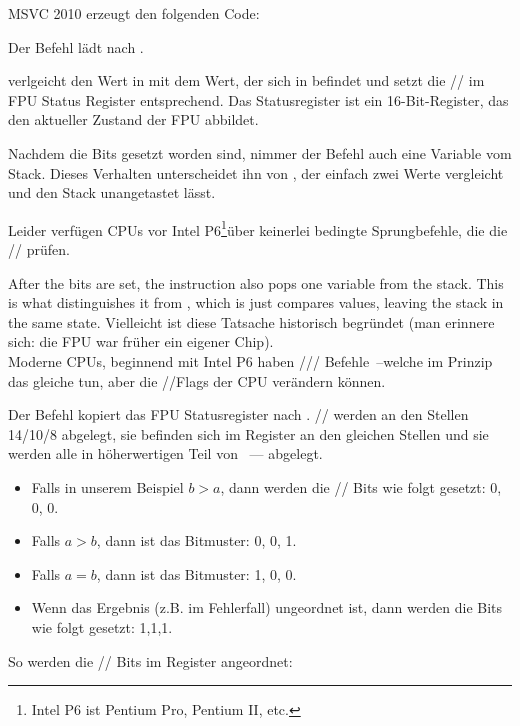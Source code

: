 
MSVC 2010 erzeugt den folgenden Code:




Der Befehl \FLD lädt  nach .

\label{Czero_etc}
\newcommand{\Czero}{\GTT{C0}\xspace}
\newcommand{\Ctwo}{\GTT{C2}\xspace}
\newcommand{\Cthree}{\GTT{C3}\xspace}
\newcommand{\CThreeBits}{\Cthree/\Ctwo/\Czero}

\FCOMP verlgeicht den Wert in  mit dem Wert, der sich in 
befindet und setzt die \CThreeBits im FPU Status Register entsprechend.
Das Statusregister ist ein 16-Bit-Register, das den aktueller Zustand der FPU
abbildet.

Nachdem die Bits gesetzt worden sind, nimmer der \FCOMP Befehl auch eine
Variable vom Stack. Dieses Verhalten unterscheidet ihn von \FCOM, der einfach
zwei Werte vergleicht und den Stack unangetastet lässt.

Leider verfügen CPUs vor Intel P6\footnote{Intel P6 ist Pentium Pro, Pentium II,
etc.}über keinerlei bedingte Sprungbefehle, die die \CThreeBits prüfen.

After the bits are set, the \FCOMP instruction also pops one variable from the stack. 
This is what distinguishes it from \FCOM, which is just compares values, leaving the stack in the same state.
Vielleicht ist diese Tatsache historisch begründet (man erinnere sich: die FPU
war früher ein eigener Chip).\\
Moderne CPUs, beginnend mit Intel P6 haben \FCOMI/\FCOMIP/\FUCOMI/\FUCOMIP
Befehle~--welche im Prinzip das gleiche tun, aber die \ZF/\PF/\CF Flags der CPU
verändern können.

Der \FNSTSW Befehl kopiert das FPU Statusregister nach \AX.
\CThreeBits werden an den Stellen 14/10/8 abgelegt, sie befinden sich im \AX
Register an den gleichen Stellen und sie werden alle in höherwertigen Teil von
\AX{}~---\AH{} abgelegt.

\begin{itemize}
\item Falls in unserem Beispiel $b>a$, dann werden die \CThreeBits Bits wie
folgt gesetzt: 0, 0, 0.
\item Falls $a>b$, dann ist das Bitmuster: 0, 0, 1.
\item Falls $a=b$, dann ist das Bitmuster: 1, 0, 0.
\item

Wenn das Ergebnis (z.B. im Fehlerfall) ungeordnet ist, dann werden die Bits wie
folgt gesetzt: 1,1,1.
\end{itemize}
So werden die \CThreeBits Bits im \AX Register angeordnet:

